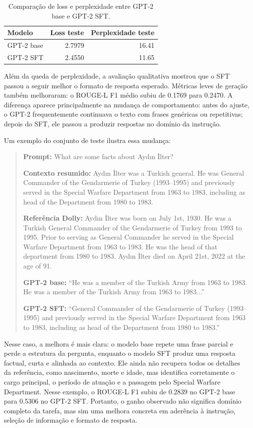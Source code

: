 \documentclass[a4paper,12pt]{article}
\begin{document}
\begin{table}[h]
\centering
\begin{tabular}{|l|r|r|}
\hline
\textbf{Modelo} & \textbf{Loss teste} & \textbf{Perplexidade teste} \\
\hline
GPT-2 base & 2.7979 & 16.41 \\
GPT-2 SFT & 2.4550 & 11.65 \\
\hline
\end{tabular}
\caption{Comparação de loss e perplexidade entre GPT-2 base e GPT-2 SFT.}
\end{table}

Além da queda de perplexidade, a avaliação qualitativa mostrou que o SFT passou a seguir melhor o formato de resposta esperado. Métricas leves de geração também melhoraram: o ROUGE-L F1 médio subiu de 0.1769 para 0.2470. A diferença aparece principalmente na mudança de comportamento: antes do ajuste, o GPT-2 frequentemente continuava o texto com frases genéricas ou repetitivas; depois do SFT, ele passou a produzir respostas no domínio da instrução.

Um exemplo do conjunto de teste ilustra essa mudança:

\begin{quote}
\small
\textbf{Prompt:} What are some facts about Aydın İlter?

\textbf{Contexto resumido:} Aydın İlter was a Turkish general. He was General Commander of the Gendarmerie of Turkey (1993--1995) and previously served in the Special Warfare Department from 1963 to 1983, including as head of the Department from 1980 to 1983.

\textbf{Referência Dolly:} Aydın İlter was born on July 1st, 1930. He was a Turkish General Commander of the Gendarmerie of Turkey from 1993 to 1995. Prior to serving as General Commander he served in the Special Warfare Department from 1963 to 1983. He was the head of that department from 1980 to 1983. Aydın İlter died on April 21st, 2022 at the age of 91.

\textbf{GPT-2 base:} ``He was a member of the Turkish Army from 1963 to 1983. He was a member of the Turkish Army from 1963 to 1983...''

\textbf{GPT-2 SFT:} ``General Commander of the Gendarmerie of Turkey (1993--1995) and previously served in the Special Warfare Department from 1963 to 1983, including as head of the Department from 1980 to 1983.''
\end{quote}

Nesse caso, a melhora é mais clara: o modelo base repete uma frase parcial e perde a estrutura da pergunta, enquanto o modelo SFT produz uma resposta factual, curta e alinhada ao contexto. Ele ainda não recupera todos os detalhes da referência, como nascimento, morte e idade, mas identifica corretamente o cargo principal, o período de atuação e a passagem pelo Special Warfare Department. Nesse exemplo, o ROUGE-L F1 subiu de 0.2839 no GPT-2 base para 0.5306 no GPT-2 SFT. Portanto, o ganho observado não significa domínio completo da tarefa, mas sim uma melhora concreta em aderência à instrução, seleção de informação e formato de resposta.
\end{document}
